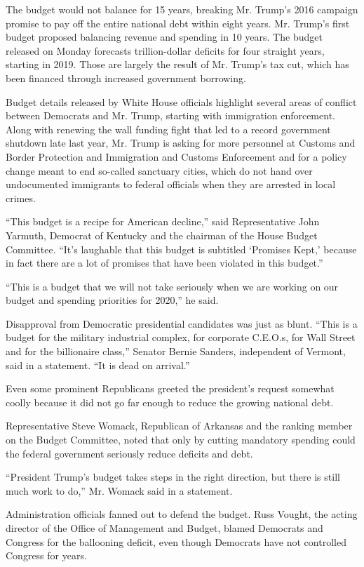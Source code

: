 The budget would not balance for 15 years, breaking Mr. Trump's 2016
campaign promise to pay off the entire national debt within eight years.
Mr. Trump's first budget proposed balancing revenue and spending in 10
years. The budget released on Monday forecasts trillion-dollar deficits
for four straight years, starting in 2019. Those are largely the result
of Mr. Trump's tax cut, which has been financed through increased
government borrowing.

Budget details released by White House officials highlight several areas
of conflict between Democrats and Mr. Trump, starting with immigration
enforcement. Along with renewing the wall funding fight that led to a
record government shutdown late last year, Mr. Trump is asking for more
personnel at Customs and Border Protection and Immigration and Customs
Enforcement and for a policy change meant to end so-called sanctuary
cities, which do not hand over undocumented immigrants to federal
officials when they are arrested in local crimes.

``This budget is a recipe for American decline,'' said Representative
John Yarmuth, Democrat of Kentucky and the chairman of the House Budget
Committee. ``It's laughable that this budget is subtitled `Promises
Kept,' because in fact there are a lot of promises that have been
violated in this budget.''

``This is a budget that we will not take seriously when we are working
on our budget and spending priorities for 2020,'' he said.

Disapproval from Democratic presidential candidates was just as blunt.
``This is a budget for the military industrial complex, for corporate
C.E.O.s, for Wall Street and for the billionaire class,'' Senator Bernie
Sanders, independent of Vermont, said in a statement. ``It is dead on
arrival.''

Even some prominent Republicans greeted the president's request somewhat
coolly because it did not go far enough to reduce the growing national
debt.

Representative Steve Womack, Republican of Arkansas and the ranking
member on the Budget Committee, noted that only by cutting mandatory
spending could the federal government seriously reduce deficits and
debt.

``President Trump's budget takes steps in the right direction, but there
is still much work to do,'' Mr. Womack said in a statement.

Administration officials fanned out to defend the budget. Russ Vought,
the acting director of the Office of Management and Budget, blamed
Democrats and Congress for the ballooning deficit, even though Democrats
have not controlled Congress for years.

